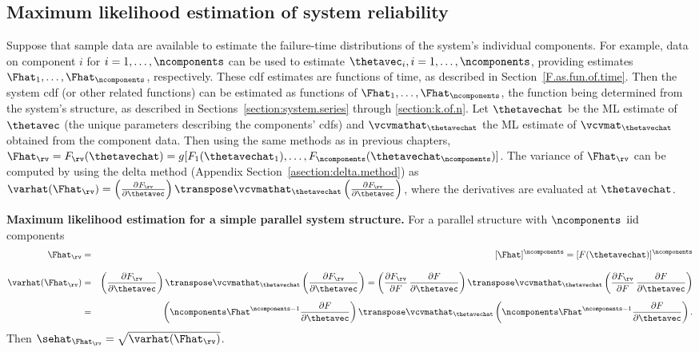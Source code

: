 \subsection{Maximum likelihood estimation of system reliability}
Suppose that sample data are available to estimate the failure-time
distributions of the system's individual components.  For example,
data on component $i$ for $i=1,\dots, \ncomponents $ can be used to
estimate $\thetavec_{i}, i=1,\dots,\ncomponents$, providing
estimates $\Fhat_{1}, \ldots, \Fhat_{\ncomponents}$,
respectively. These cdf estimates are functions of time, as
described in Section~\ref{F.as.fun.of.time}. Then the system cdf (or
other related functions) can be estimated as functions of
$\Fhat_{1},
\ldots, \Fhat_{\ncomponents}$, the function being 
determined from the system's structure, as described in
Sections~\ref{section:system.series} through
\ref{section:k.of.n}.  Let $\thetavechat$ be the ML estimate of
$\thetavec$ (the unique parameters describing
the components' cdfs) and $\vcvmathat_{\thetavechat}$ the ML
estimate of $\vcvmat_{\thetavechat}$ obtained from the component
data. Then using the same methods as in previous chapters,
$\Fhat_{\rv}=F_{\rv}(\thetavechat) =g[F_{1}(\thetavechat_{1}),
\ldots, F_{\ncomponents}(\thetavechat_{\ncomponents})]$. The
variance of $\Fhat_{\rv}$ can be computed by using the delta method
(Appendix Section~\ref{asection:delta.method}) as
$\varhat(\Fhat_{\rv})= \left (\frac{\partial F_{\rv}}{\partial
\thetavec } \right ) \transpose
\vcvmathat_{\thetavechat} 	\left (\frac{\partial
F_{\rv}}{\partial \thetavec } \right )$, where the derivatives are
evaluated at $\thetavechat$.

\begin{example}
{\bf 
Maximum likelihood estimation for a simple parallel system structure.
}For a parallel structure with 
$\ncomponents$ ${\rm iid}$ components
\begin{eqnarray*}
\Fhat_{\rv}&=& [\Fhat]^{\ncomponents} = [F(\thetavechat)]^{\ncomponents}
\\[2ex]
\varhat(\Fhat_{\rv})&=&
	\left (\frac{\partial F_{\rv}}{\partial \thetavec }
 	\right ) \transpose
 	\vcvmathat_{\thetavechat}
	\left (\frac{\partial F_{\rv}}{\partial \thetavec } \right )=
 \left (\frac{\partial F_{\rv}}{\partial F} \, \frac{\partial F}{\partial \thetavec }
 	\right ) \transpose
 	\vcvmathat_{\thetavechat}
        \left (
\frac{\partial F_{\rv}}{\partial F} \, \frac{\partial F}{\partial \thetavec }	
        \right )\\[1ex]
&=&
	\left (\ncomponents \Fhat^{\ncomponents-1}\frac{\partial F}{\partial \thetavec }
 	\right ) \transpose
 	\vcvmathat_{\thetavechat}
        \left (
\ncomponents \Fhat^{\ncomponents-1}\frac{\partial F}{\partial \thetavec }	
        \right ).
\end{eqnarray*}
Then $\sehat_{\Fhat_{\rv}}= \sqrt{\varhat(\Fhat_{\rv})}$.
\end{example}

